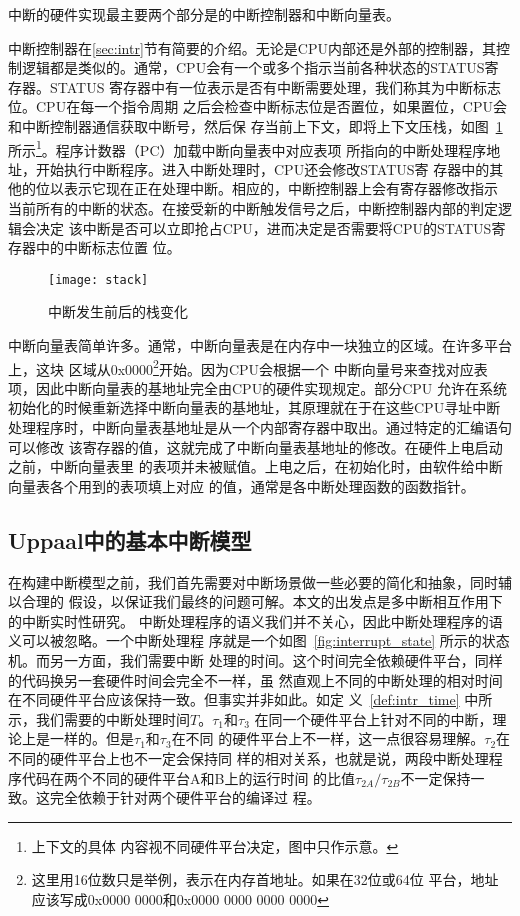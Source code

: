 中断的硬件实现最主要两个部分是的中断控制器和中断向量表。

中断控制器在\ref{sec:intr}节有简要的介绍。无论是CPU内部还是外部的控制器，其控
制逻辑都是类似的。通常，CPU会有一个或多个指示当前各种状态的STATUS寄存器。STATUS
寄存器中有一位表示是否有中断需要处理，我们称其为中断标志位。CPU在每一个指令周期
之后会检查中断标志位是否置位，如果置位，CPU会和中断控制器通信获取中断号，然后保
存当前上下文，即将上下文压栈，如图~\ref{fig:stack} 所示\footnote{上下文的具体
内容视不同硬件平台决定，图中只作示意。}。程序计数器（PC）加载中断向量表中对应表项
所指向的中断处理程序地址，开始执行中断程序。进入中断处理时，CPU还会修改STATUS寄
存器中的其他的位以表示它现在正在处理中断。相应的，中断控制器上会有寄存器修改指示
当前所有的中断的状态。在接受新的中断触发信号之后，中断控制器内部的判定逻辑会决定
该中断是否可以立即抢占CPU，进而决定是否需要将CPU的STATUS寄存器中的中断标志位置
位。

\begin{figure}[H]
	\centering
	\texttt{[image: stack]}
	\caption{中断发生前后的栈变化}
	\label{fig:stack}
\end{figure}

中断向量表简单许多。通常，中断向量表是在内存中一块独立的区域。在许多平台上，这块
区域从0x0000\footnote{这里用16位数只是举例，表示在内存首地址。如果在32位或64位
平台，地址应该写成0x0000 0000和0x0000 0000 0000 0000}开始。因为CPU会根据一个
中断向量号来查找对应表项，因此中断向量表的基地址完全由CPU的硬件实现规定。部分CPU
允许在系统初始化的时候重新选择中断向量表的基地址，其原理就在于在这些CPU寻址中断
处理程序时，中断向量表基地址是从一个内部寄存器中取出。通过特定的汇编语句可以修改
该寄存器的值，这就完成了中断向量表基地址的修改。在硬件上电启动之前，中断向量表里
的表项并未被赋值。上电之后，在初始化时，由软件给中断向量表各个用到的表项填上对应
的值，通常是各中断处理函数的函数指针。

\subsection{Uppaal中的基本中断模型}
\label{subsec:basic_uppaal}

在构建中断模型之前，我们首先需要对中断场景做一些必要的简化和抽象，同时辅以合理的
假设，以保证我们最终的问题可解。本文的出发点是多中断相互作用下的中断实时性研究。
中断处理程序的语义我们并不关心，因此中断处理程序的语义可以被忽略。一个中断处理程
序就是一个如图~\ref{fig:interrupt_state} 所示的状态机。而另一方面，我们需要中断
处理的时间。这个时间完全依赖硬件平台，同样的代码换另一套硬件时间会完全不一样，虽
然直观上不同的中断处理的相对时间在不同硬件平台应该保持一致。但事实并非如此。如定
义~\ref{def:intr_time} 中所示，我们需要的中断处理时间$T$。$\tau_1$和$\tau_3$
在同一个硬件平台上针对不同的中断，理论上是一样的。但是$\tau_1$和$\tau_3$在不同
的硬件平台上不一样，这一点很容易理解。$\tau_2$在不同的硬件平台上也不一定会保持同
样的相对关系，也就是说，两段中断处理程序代码在两个不同的硬件平台A和B上的运行时间
的比值$\tau_{2A}/\tau_{2B}$不一定保持一致。这完全依赖于针对两个硬件平台的编译过
程。

